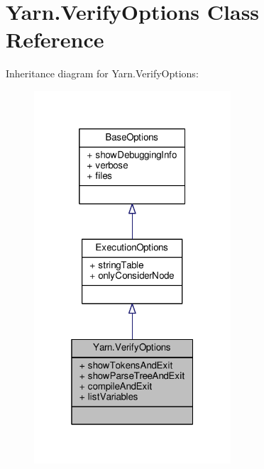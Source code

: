 \hypertarget{a00166}{\section{Yarn.\-Verify\-Options Class Reference}
\label{a00166}
}


Inheritance diagram for Yarn.\-Verify\-Options\-:
\nopagebreak
\begin{figure}[H]
\begin{center}
\leavevmode
\includegraphics[width=208pt]{dd/d6b/a00649}
\end{center}
\end{figure}


